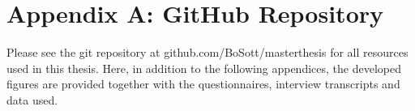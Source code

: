 
\chapter{Appendix A: GitHub Repository} %

\label{AppendixA} %

Please see the git repository at github.com/BoSott/masterthesis for all resources used in this thesis. Here, in addition to the following appendices, the developed figures are provided together with the questionnaires, interview transcripts and data used.

